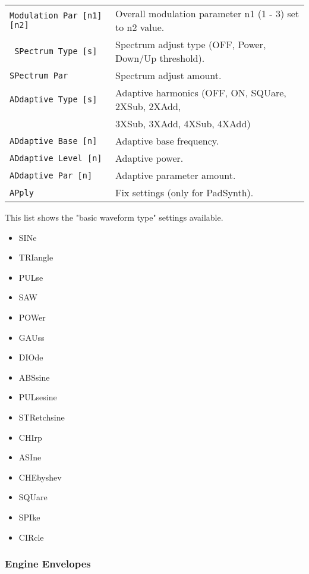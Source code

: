 \begin{table}[H]
\begin{tabular}{l l}
   \texttt{Modulation Par [n1] [n2]} &
      Overall modulation parameter n1 (1 - 3) set to n2 value. \\
   \texttt{ SPectrum Type [s]} &
       Spectrum adjust type (OFF, Power, Down/Up threshold). \\
   \texttt{SPectrum Par } &
      Spectrum adjust amount. \\
   \texttt{ADdaptive Type [s]} &
      Adaptive harmonics (OFF, ON, SQUare, 2XSub, 2XAdd, \\
   \texttt{} &
       3XSub, 3XAdd, 4XSub, 4XAdd) \\
   \texttt{ADdaptive Base [n]} &
      Adaptive base frequency. \\
   \texttt{ADdaptive Level [n]} &
      Adaptive power. \\
   \texttt{ADdaptive Par [n]} &
      Adaptive parameter amount. \\

   \texttt{APply} &
      Fix settings (only for PadSynth). \\

      \end{tabular}
   \end{table}

   This list shows the "basic waveform type" settings available.

   \begin{itemize}
      \item SINe
      \item TRIangle
      \item PULse
      \item SAW
      \item POWer
      \item GAUss
      \item DIOde
      \item ABSsine
      \item PULsesine
      \item STRetchsine
      \item CHIrp
      \item ASIne
      \item CHEbyshev
      \item SQUare
      \item SPIke
      \item CIRcle
   \end{itemize}

\subsubsection{Engine Envelopes}
\label{subsec:command_line_engine_envelopes}

